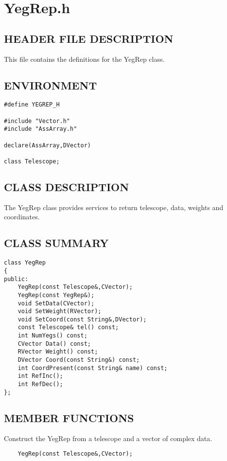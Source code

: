 \clearpage
\section{YegRep.h}

\subsection*{HEADER FILE DESCRIPTION}
 This file contains the definitions for the YegRep class.
  
\subsection*{ENVIRONMENT}
\begin{verbatim}
#define YEGREP_H

#include "Vector.h"
#include "AssArray.h"

declare(AssArray,DVector)

class Telescope;
\end{verbatim}

\subsection*{CLASS DESCRIPTION}
   The YegRep class provides services to return telescope, data, weights
   and coordinates.

\subsection*{CLASS SUMMARY}
\begin{verbatim}
class YegRep
{
public:
    YegRep(const Telescope&,CVector);
    YegRep(const YegRep&);
    void SetData(CVector);
    void SetWeight(RVector);
    void SetCoord(const String&,DVector);
    const Telescope& tel() const;
    int NumYegs() const;
    CVector Data() const;
    RVector Weight() const;
    DVector Coord(const String&) const;
    int CoordPresent(const String& name) const;
    int RefInc();
    int RefDec();
};
\end{verbatim}

\subsection*{MEMBER FUNCTIONS}
  
    Construct the YegRep from a telescope and a vector of complex data.
\begin{verbatim}
    YegRep(const Telescope&,CVector);
\end{verbatim}
  
